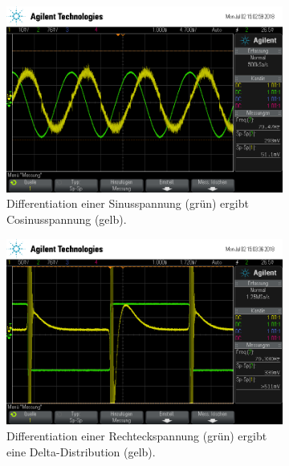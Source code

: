 \begin{figure}[ht]
  \centering
  \begin{subfigure}[]{\textwidth}
    \centering
    \includegraphics[height=0.28\textheight]{data/scope_265.png}
    \caption{Differentiation einer Sinusspannung (grün) ergibt Cosinusspannung (gelb).}
    \label{subfig:dif_sinus}
  \end{subfigure}
  \begin{subfigure}[]{\textwidth}
    \centering
    \includegraphics[height=0.28\textheight]{data/scope_266.png}
    \caption{Differentiation einer Rechteckspannung (grün) ergibt eine Delta-Distribution (gelb).}
    \label{subfig:dif_rechteck}
  \end{subfigure}
  \begin{subfigure}[]{\textwidth}
    \centering

\end{subfigure}
\end{figure}
